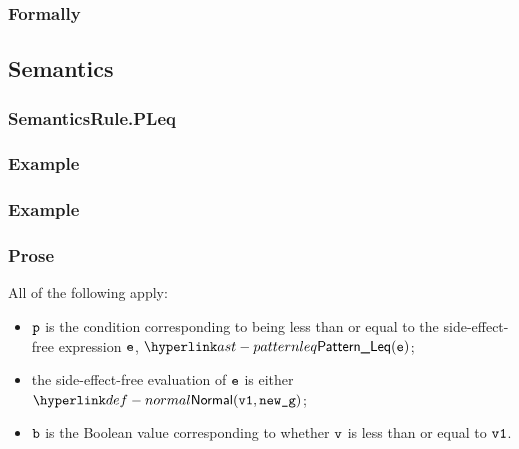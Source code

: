 \subsubsection{Formally}
\begin{mathpar}
\end{mathpar}

\subsection{Semantics}
\subsubsection{SemanticsRule.PLeq \label{sec:SemanticsRule.PLeq}}
\subsubsection{Example}

\subsubsection{Example}

\subsubsection{Prose}
All of the following apply:
\begin{itemize}
  \item $\vp$ is the condition corresponding to being less than or equal
    to the side-effect-free expression $\ve$, $\PatternLeq(\ve)$;
  \item the side-effect-free evaluation of $\ve$ is either
  $\Normal(\vvone, \newg)$\ProseOrError;
  \item $\vb$ is the Boolean value corresponding to whether $\vv$
    is less than or equal to $\vvone$.
\end{itemize}
